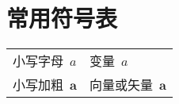 \chapter{常用符号表}
\begin{center}
	\begin{tabular}{p{7em}p{20em}}
		小写字母~$a$          & 变量~$a$                   \\
		小写加粗~$\mathbf{a}$ & 向量或矢量~$\mathbf{a}$
	\end{tabular}
\end{center}

